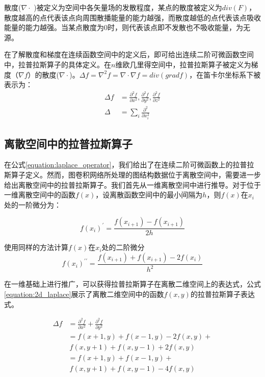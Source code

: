 散度($\nabla \cdot$ )被定义为空间中各矢量场的发散程度，某点的散度被定义为$div(F)$，散度越高的点代表该点向周围散播能量的能力越强，而散度越低的点代表该点吸收能量的能力越强。当某点散度为0时，则代表该点即不发散也不吸收能量，为无源。

在了解散度和梯度在连续函数空间中的定义后，即可给出连续二阶可微函数空间中，拉普拉斯算子的具体定义。在$n$维欧几里得空间中，拉普拉斯算子被定义为梯度（$\nabla f$）的散度($\nabla \cdot$)。$\Delta f = \nabla^2 f = \nabla \cdot \nabla f = div(grad f)$，在笛卡尔坐标系下被表示为：
\begin{equation}
    \begin{aligned}
        \Delta f &= \frac{\partial^2 f}{\partial x^2}, \frac{\partial^2 f}{\partial y^2}, \frac{\partial^2 f}{\partial z^2}
        \\
        \Delta &= \sum_{i} \frac{\partial^2}{\partial x^2_i}
   \end{aligned}
    \label{equation:laplace_operator}
\end{equation}

\subsection{离散空间中的拉普拉斯算子}\label{discrate_laplace}
在公式\ref{equation:laplace_operator}，我们给出了在连续二阶可微函数上的拉普拉斯算子定义。然而，图卷积网络所处理的图结构数据位于离散空间中，需要进一步给出离散空间中的拉普拉斯算子。我们首先从一维离散空间中进行推导。对于位于一维离散空间中的函数$f(x)$，设离散函数空间中的最小间隔为$h$，则$f(x)$在$x_i$处的一阶微分为：

\begin{equation}
    f(x_i)^{\prime} = \frac{ f(x_{i+1}) - f(x_{i+1}) }{2h} 
    \label{equation:frist_order}
\end{equation}

使用同样的方法计算$f(x)$在$x_i$处的二阶微分
\begin{equation}
    f(x_i)^{\prime \prime} = \frac{ f(x_{i+1}) + f(x_{i+1}) - 2f(x_i) }{h^2} 
    \label{equation:second_order}
\end{equation}

在一维基础上进行推广，可以获得拉普拉斯算子在离散二维空间上的表达式，公式\ref{equation:2d_laplace}展示了离散二维空间中的函数$f(x,y)$的拉普拉斯算子表达式。

\begin{equation}
    \begin{aligned}
        \Delta f &= \frac{\partial^2 f}{\partial x^2} + \frac{\partial^2 f}{\partial y^2} \\
        &= f(x+1, y) + f(x-1, y) - 2f(x, y) + \\
        &\ f(x, y+1) + f(x, y-1) + 2f(x, y) \\
        &= f(x+1, y) + f(x-1, y) + \\
        &\ f(x, y+1) + f(x, y-1) - 4f(x,y)
    \end{aligned}
    \label{equation:2d_laplace}
\end{equation}

